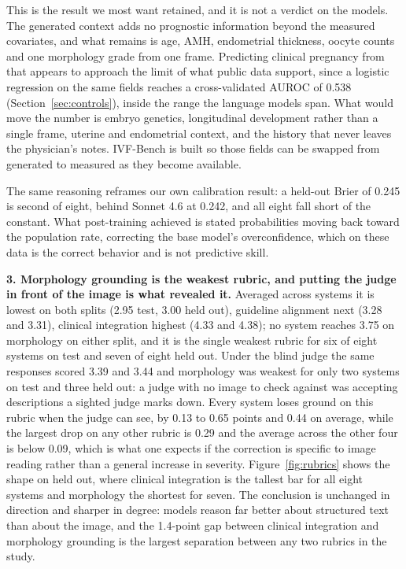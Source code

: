 This is the result we most want retained, and it is not a verdict on the models.
The generated context adds no prognostic information beyond the measured
covariates, and what remains is age, AMH, endometrial thickness, oocyte counts
and one morphology grade from one frame. Predicting clinical pregnancy from that
appears to approach the limit of what public data support, since a logistic
regression on the same fields reaches a cross-validated AUROC of 0.538
(Section~\ref{sec:controls}), inside the range the language models span. What
would move the number is embryo genetics, longitudinal development rather than a
single frame, uterine and endometrial context, and the history that never leaves
the physician's notes. IVF-Bench is built so those fields can be swapped from
generated to measured as they become available.

The same reasoning reframes our own calibration result: a held-out Brier of 0.245
is second of eight, behind Sonnet 4.6 at 0.242, and all eight fall short of the
constant. What post-training achieved is stated probabilities moving back toward
the population rate, correcting the base model's overconfidence, which on these
data is the correct behavior and is not predictive skill.

\textbf{3. Morphology grounding is the weakest rubric, and putting the judge in
front of the image is what revealed it.} Averaged across systems it is lowest on
both splits (2.95 test, 3.00 held out), guideline alignment next (3.28 and 3.31),
clinical integration highest (4.33 and 4.38); no system reaches 3.75 on
morphology on either split, and it is the single weakest rubric for six of eight
systems on test and seven of eight held out. Under the blind judge the same
responses scored 3.39 and 3.44 and morphology was weakest for only two systems on
test and three held out: a judge with no image to check against was accepting
descriptions a sighted judge marks down. Every system loses ground on this rubric
when the judge can see, by 0.13 to 0.65 points and 0.44 on average, while the
largest drop on any other rubric is 0.29 and the average across the other four is
below 0.09, which is what one expects if the correction is specific to image
reading rather than a general increase in severity.
Figure~\ref{fig:rubrics} shows the shape on held out, where clinical integration
is the tallest bar for all eight systems and morphology the shortest for seven.
The conclusion is unchanged in direction and sharper in degree: models reason far
better about structured text than about the image, and the 1.4-point gap between
clinical integration and morphology grounding is the largest separation between
any two rubrics in the study.

